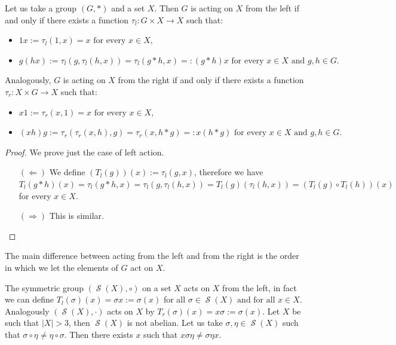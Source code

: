 \documentclass[mat1]{fmfdeloTS2.0}
\newcommand{\obs}{}				%
\DeclareMathOperator{\symm}{\mathcal{S}}		%
\begin{document}
\begin{proposition}
Let us take a group $(G,*)$ and a set $X$. Then $G$ is acting on $X$ from the left \obs{if and only if} there exists a function $\tau_l:G\times X\longrightarrow X$ such that:
\begin{itemize}
\item $1x:=\tau_l(1,x)=x\text{ for every }x\in X,$
\item $g(hx):=\tau_l(g,\tau_l(h,x))=\tau_l(g* h,x)=:(g*h)x\text{ for every }x\in X\text{ and }g,h\in G.$
\end{itemize}

Analogously, $G$ is acting on $X$ from the right \obs{if and only if} there exists a function $\tau_r:X\times G\longrightarrow X$ such that:
\begin{itemize}
\item $x1:=\tau_r(x,1)=x\text{ for every }x\in X,$
\item $(xh)g:=\tau_r(\tau_r(x,h),g)=\tau_r(x,h* g)=:x(h*g)\text{ for every }x\in X\text{ and }g,h\in G.$
\end{itemize}
\label{prop:actions}
\end{proposition}
\begin{proof}
We prove just the case of left action.
\begin{itemize}

\item[$(\Leftarrow)$] We define $(T_l(g))(x):=\tau_l(g,x)$, therefore we have $T_l(g*h)(x)=\tau_l(g*h,x)=\tau_l(g,\tau_l(h,x))=T_l(g)(\tau_l(h,x))=(T_l(g)\circ T_l(h))(x)$ for every $x\in X$.

\item[$(\Rightarrow)$] This is similar.\qedhere
\end{itemize}
\end{proof}

The main difference between acting from the left and from the right is the order in which we let the elements of $G$ act on $X$.

\begin{example}
The symmetric group $(\symm(X), \circ)$ on a set $X$ acts on $X$ from the left, in fact we can define $T_l(\sigma)(x)=\sigma x:=\sigma(x)$ for all $\sigma\in\symm(X)\text{ and for all } x\in X$. Analogously $(\symm(X),\cdot)$ acts on $X$ by $T_r(\sigma)(x)=x\sigma:=\sigma(x)$. 
Let $X$ be such that $|X|> 3$, then $\symm(X)$ is not abelian. Let us take $\sigma,\eta\in\symm(X)$ such that $\sigma\circ\eta\neq\eta\circ\sigma$. Then there exists $x$ such that $x\sigma\eta\neq\sigma\eta x$. 
\label{ex: symm actions problems}
\end{example}
\end{document}
